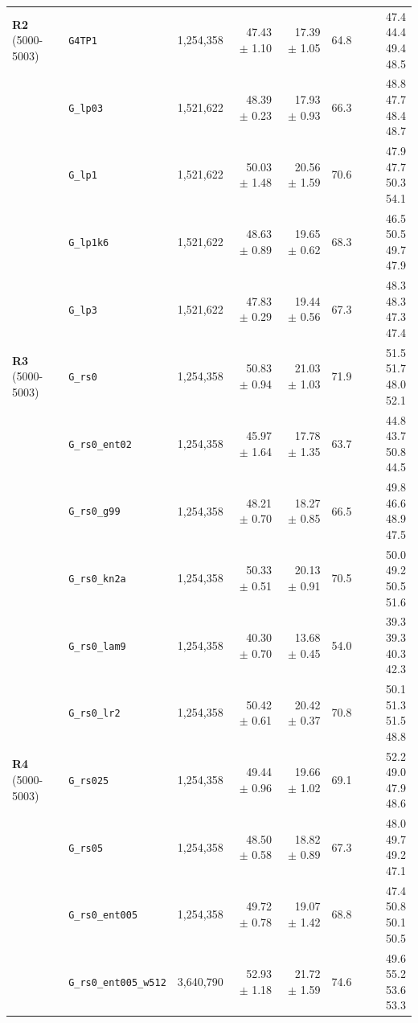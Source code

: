 \begin{longtable}{@{}llrrrrr@{}}
\midrule
\textbf{R2}\,{\scriptsize(5000-5003)} & \texttt{\scriptsize G4TP1} & 1,254,358 & 47.43 $\pm$ 1.10 & 17.39 $\pm$ 1.05 & 64.8 & {\scriptsize 47.4 44.4 49.4 48.5}\\
 & \texttt{\scriptsize G\_lp03} & 1,521,622 & 48.39 $\pm$ 0.23 & 17.93 $\pm$ 0.93 & 66.3 & {\scriptsize 48.8 47.7 48.4 48.7}\\
 & \texttt{\scriptsize G\_lp1} & 1,521,622 & 50.03 $\pm$ 1.48 & 20.56 $\pm$ 1.59 & 70.6 & {\scriptsize 47.9 47.7 50.3 54.1}\\
 & \texttt{\scriptsize G\_lp1k6} & 1,521,622 & 48.63 $\pm$ 0.89 & 19.65 $\pm$ 0.62 & 68.3 & {\scriptsize 46.5 50.5 49.7 47.9}\\
 & \texttt{\scriptsize G\_lp3} & 1,521,622 & 47.83 $\pm$ 0.29 & 19.44 $\pm$ 0.56 & 67.3 & {\scriptsize 48.3 48.3 47.3 47.4}\\
\midrule
\textbf{R3}\,{\scriptsize(5000-5003)} & \texttt{\scriptsize G\_rs0} & 1,254,358 & 50.83 $\pm$ 0.94 & 21.03 $\pm$ 1.03 & 71.9 & {\scriptsize 51.5 51.7 48.0 52.1}\\
 & \texttt{\scriptsize G\_rs0\_ent02} & 1,254,358 & 45.97 $\pm$ 1.64 & 17.78 $\pm$ 1.35 & 63.7 & {\scriptsize 44.8 43.7 50.8 44.5}\\
 & \texttt{\scriptsize G\_rs0\_g99} & 1,254,358 & 48.21 $\pm$ 0.70 & 18.27 $\pm$ 0.85 & 66.5 & {\scriptsize 49.8 46.6 48.9 47.5}\\
 & \texttt{\scriptsize G\_rs0\_kn2a} & 1,254,358 & 50.33 $\pm$ 0.51 & 20.13 $\pm$ 0.91 & 70.5 & {\scriptsize 50.0 49.2 50.5 51.6}\\
 & \texttt{\scriptsize G\_rs0\_lam9} & 1,254,358 & 40.30 $\pm$ 0.70 & 13.68 $\pm$ 0.45 & 54.0 & {\scriptsize 39.3 39.3 40.3 42.3}\\
 & \texttt{\scriptsize G\_rs0\_lr2} & 1,254,358 & 50.42 $\pm$ 0.61 & 20.42 $\pm$ 0.37 & 70.8 & {\scriptsize 50.1 51.3 51.5 48.8}\\
\midrule
\textbf{R4}\,{\scriptsize(5000-5003)} & \texttt{\scriptsize G\_rs025} & 1,254,358 & 49.44 $\pm$ 0.96 & 19.66 $\pm$ 1.02 & 69.1 & {\scriptsize 52.2 49.0 47.9 48.6}\\
 & \texttt{\scriptsize G\_rs05} & 1,254,358 & 48.50 $\pm$ 0.58 & 18.82 $\pm$ 0.89 & 67.3 & {\scriptsize 48.0 49.7 49.2 47.1}\\
 & \texttt{\scriptsize G\_rs0\_ent005} & 1,254,358 & 49.72 $\pm$ 0.78 & 19.07 $\pm$ 1.42 & 68.8 & {\scriptsize 47.4 50.8 50.1 50.5}\\
 & \texttt{\scriptsize G\_rs0\_ent005\_w512} & 3,640,790 & 52.93 $\pm$ 1.18 & 21.72 $\pm$ 1.59 & 74.6 & {\scriptsize 49.6 55.2 53.6 53.3}\\

\end{longtable}
